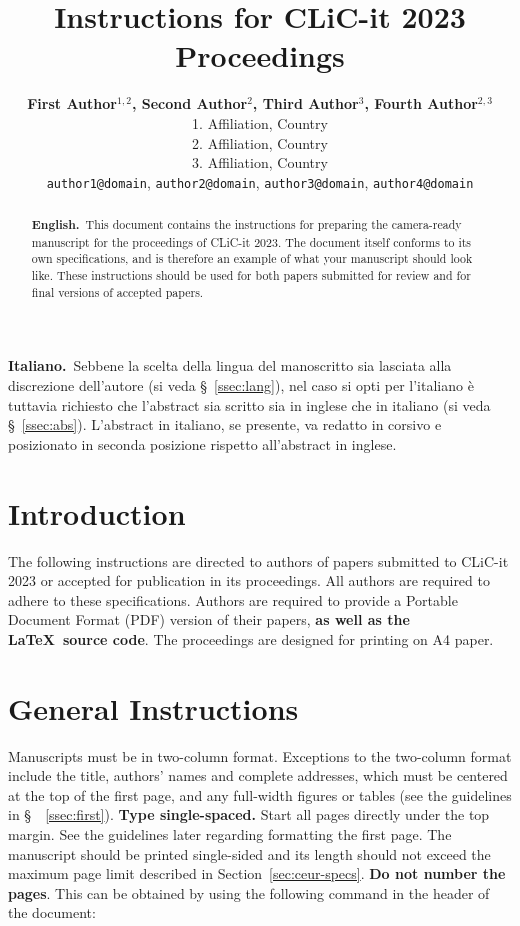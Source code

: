 \documentclass[11pt]{article}
\title{Instructions for CLiC-it 2023 Proceedings}
\author{\textbf{First Author$^{1,2}$, Second Author$^{2}$, Third Author$^{3}$, Fourth Author$^{2,3}$} \\
  1. Affiliation, Country \\
  2. Affiliation, Country \\
  3. Affiliation, Country \\
  {\tt author1@domain}, {\tt author2@domain}, {\tt author3@domain}, {\tt author4@domain}}
\date{}
\begin{document}
\maketitle
\begin{abstract}
\textbf{English.}~This document contains the instructions for preparing the camera-ready manuscript for the proceedings of CLiC-it 2023. The document itself conforms to its own specifications, and is therefore an example of what your manuscript should look like. These instructions should be used for both papers submitted for review and for final versions of accepted papers.
\end{abstract}

\begin{abstract-alt}
 \textrm{\bf{Italiano.}}~Sebbene la scelta della lingua del manoscritto sia lasciata alla discrezione dell'autore (si veda \S\ \ref{ssec:lang}), nel caso si opti per l'italiano è tuttavia richiesto che l'abstract sia scritto sia in inglese che in italiano (si veda \S\ \ref{ssec:abs}). L'abstract in italiano, se presente, va redatto in corsivo e posizionato in seconda posizione rispetto all'abstract in inglese.
\end{abstract-alt}


\section{Introduction}

The following instructions are directed to authors of papers submitted
to CLiC-it 2023 or accepted for publication in its proceedings. All
authors are required to adhere to these specifications. Authors are
required to provide a Portable Document Format (PDF) version of their
papers, \textbf{as well as the \LaTeX\ source code}. The proceedings are designed for printing on A4 paper.

\section{General Instructions}

Manuscripts must be in two-column format.  Exceptions to the
two-column format include the title, authors' names and complete
addresses, which must be centered at the top of the first page, and
any full-width figures or tables (see the guidelines in \S\ ~\ref{ssec:first}). {\bf Type single-spaced.}  Start all
pages directly under the top margin. See the guidelines later
regarding formatting the first page.  The manuscript should be
printed single-sided and its length
should not exceed the maximum page limit described in Section~\ref{sec:ceur-specs}.
{\bf Do not number the pages}. This can be obtained by using the following command in the header of the document: 
\end{document}
